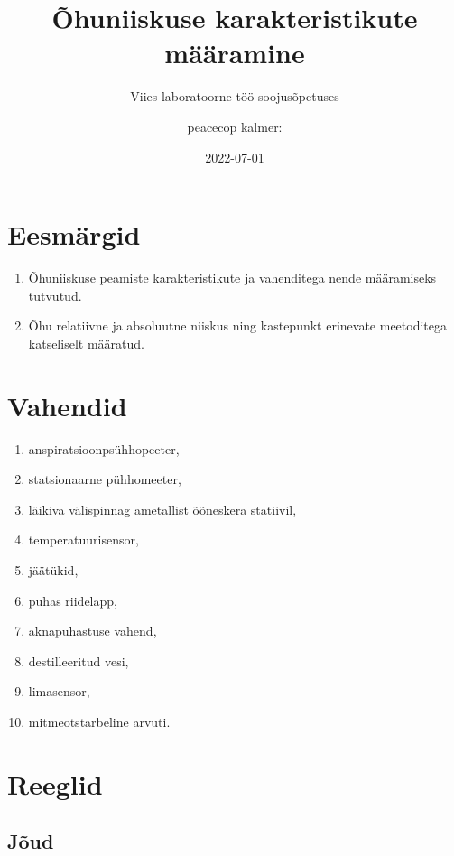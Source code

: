 \documentclass[
  12pt,
  a4paper,
  onecolumn, twoside]{article}
\title{Õhuniiskuse karakteristikute määramine}
\subtitle{Viies laboratoorne töö soojusõpetuses}
\author{peacecop kalmer:}
\date{2022-07-01}
\begin{document}
\maketitle

{
\setcounter{tocdepth}{2}
\tableofcontents
}
\listoffigures
\listoftables
{}

\hypertarget{eesmuxe4rgid}{%
\section{Eesmärgid}\label{eesmuxe4rgid}}

\begin{enumerate}
\def\labelenumi{\arabic{enumi}.}
\item
  Õhuniiskuse peamiste karakteristikute ja vahenditega nende määramiseks tutvutud.
\item
  Õhu relatiivne ja absoluutne niiskus ning kastepunkt erinevate meetoditega katseliselt määratud.
\end{enumerate}

\hypertarget{vahendid}{%
\section{Vahendid}\label{vahendid}}

\begin{enumerate}
\def\labelenumi{\arabic{enumi}.}
\item
  anspiratsioonpsühhopeeter,
\item
  statsionaarne pühhomeeter,
\item
  läikiva välispinnag ametallist õõneskera statiivil,
\item
  temperatuurisensor,
\item
  jäätükid,
\item
  puhas riidelapp,
\item
  aknapuhastuse vahend,
\item
  destilleeritud vesi,
\item
  limasensor,
\item
  mitmeotstarbeline arvuti.
\end{enumerate}

\hypertarget{reeglid}{%
\section{Reeglid}\label{reeglid}}

\hypertarget{juxf5ud}{%
\subsection{Jõud}\label{juxf5ud}}
\end{document}
